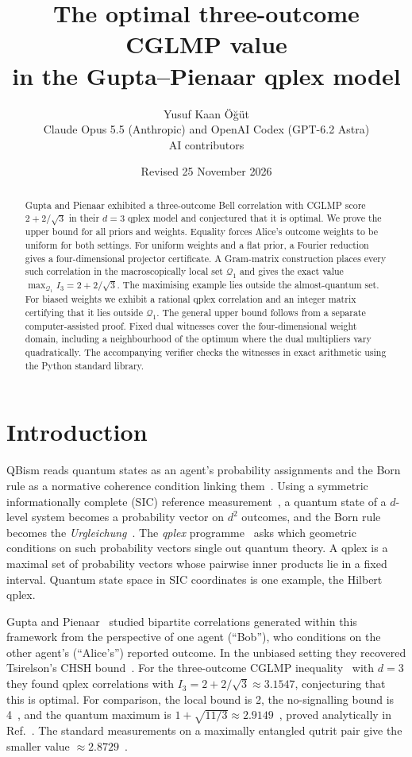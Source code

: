 \documentclass[11pt]{article}
\title{The optimal three-outcome CGLMP value\\in the Gupta--Pienaar qplex model}
\author{Yusuf Kaan \"{O}\u{g}\"{u}t\\[3pt]
{\small Claude Opus 5.5 (Anthropic) and OpenAI Codex (GPT-6.2 Astra)}\\[-1pt]
{\footnotesize AI contributors}}
\date{Revised 25 November 2026}
\theoremstyle{definition}
\newcommand{\qone}{\mathcal{Q}_1}
\begin{document}
\maketitle

\begin{abstract}
Gupta and Pienaar exhibited a three-outcome Bell correlation with CGLMP score
$2+2/\sqrt3$ in their $d=3$ qplex model and conjectured that it is optimal.
We prove the upper bound for all priors and weights. Equality forces Alice's outcome weights to be uniform for both settings.
For uniform weights and a flat prior, a Fourier reduction gives a four-dimensional
projector certificate. A Gram-matrix construction places every such correlation in
the macroscopically local set $\qone$ and gives the exact value
$\max_{\qone} I_3=2+2/\sqrt3$. The maximising example lies outside the almost-quantum set.
For biased weights we exhibit a rational qplex correlation and an integer matrix
certifying that it lies outside $\qone$. The general upper bound follows from a separate
computer-assisted proof. Fixed dual witnesses cover the four-dimensional weight domain,
including a neighbourhood of the optimum where the dual multipliers vary quadratically.
The accompanying verifier checks the witnesses in exact arithmetic using the Python standard library.
\end{abstract}

\section{Introduction}

QBism reads quantum states as an agent's probability assignments and the Born rule as a normative
coherence condition linking them~\cite{FMS2014,FuchsSchack2013}. Using a symmetric informationally complete (SIC)
reference measurement~\cite{Renes2004}, a quantum state of a $d$-level system becomes a probability vector on
$d^2$ outcomes, and the Born rule becomes the \emph{Urgleichung}~\cite{FuchsSchack2013}. The \emph{qplex}
programme~\cite{Qplex2017} asks which geometric conditions on such probability vectors single out quantum theory.
A qplex is a maximal set of probability vectors whose pairwise inner products lie in a fixed interval.
Quantum state space in SIC coordinates is one example, the Hilbert qplex.

Gupta and Pienaar~\cite{GuptaPienaar2026} studied bipartite correlations generated within this framework from the
perspective of one agent (``Bob''), who conditions on the other agent's (``Alice's'') reported outcome.
In the unbiased setting they recovered Tsirelson's CHSH bound~\cite{Tsirelson1980,CHSH1969}. For the three-outcome
CGLMP inequality~\cite{CGLMP2002} with $d=3$ they found qplex correlations with
$I_3 = 2+2/\sqrt3 \approx 3.1547$, conjecturing that this is optimal. For comparison, the local bound is 2, the
no-signalling bound is 4~\cite{PopescuRohrlich1994,Barrett2007}, and the quantum maximum is
$1+\sqrt{11/3}\approx 2.9149$~\cite{Acin2002,NPA2007,NPA2008}, proved analytically in Ref.~\cite{IoannouRosset2021}.
The standard measurements on a maximally entangled qutrit pair give the smaller value $\approx2.8729$~\cite{Acin2002}.
\end{document}
